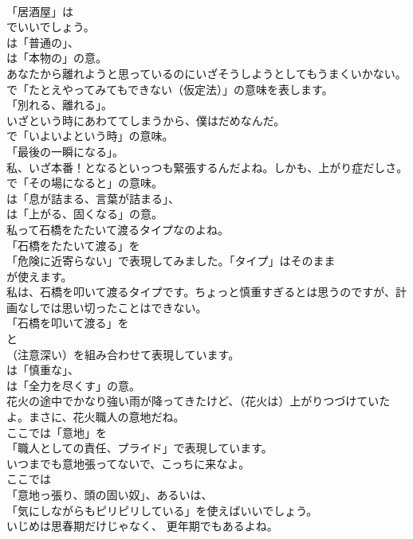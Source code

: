 \documentclass[8pt]{extreport}
\begin{document}
\begin{CJK}{UTF8}{min}
\\	「居酒屋」は
\\	でいいでしょう。
\\	は「普通の」、
\\	は「本物の」の意。	
\\	あなたから離れようと思っているのにいざそうしようとしてもうまくいかない。 
\\	で「たとえやってみてもできない（仮定法）」の意味を表します。
\\	「別れる、離れる」。	
\\	いざという時にあわててしまうから、僕はだめなんだ。 
\\	で「いよいよという時」の意味。
\\	「最後の一瞬になる」。	
\\	私、いざ本番！となるといっつも緊張するんだよね。しかも、上がり症だしさ。 
\\	で「その場になると」の意味。
\\	は「息が詰まる、言葉が詰まる」、
\\	は「上がる、固くなる」の意。	
\\	私って石橋をたたいて渡るタイプなのよね。 
\\	「石橋をたたいて渡る」を
\\	「危険に近寄らない」で表現してみました。「タイプ」はそのまま
\\	が使えます。	
\\	私は、石橋を叩いて渡るタイプです。ちょっと慎重すぎるとは思うのですが、計画なしでは思い切ったことはできない。 
\\	「石橋を叩いて渡る」を 
\\	と 
\\	（注意深い）を組み合わせて表現しています。
\\	は「慎重な」、
\\	は「全力を尽くす」の意。	
\\	花火の途中でかなり強い雨が降ってきたけど、（花火は）上がりつづけていたよ。まさに、花火職人の意地だね。 
\\	ここでは「意地」を
\\	「職人としての責任、プライド」で表現しています。	
\\	いつまでも意地張ってないで、こっちに来なよ。 
\\	ここでは
\\	「意地っ張り、頭の固い奴」、あるいは、
\\	「気にしながらもピリピリしている」を使えばいいでしょう。	
\\	いじめは思春期だけじゃなく、 更年期でもあるよね。 

\end{CJK}
\end{document}
